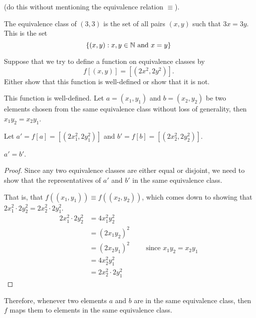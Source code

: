 \begin{problem}
\begin{enumalph}
      (do this without mentioning the equivalence relation $\equiv$).
      \begin{Answer}
        The equivalence class of $(3, 3)$ is the set of all pairs $(x, y)$
        such that $3x = 3y$.
        This is the set
        \[ \left\{(x, y) : x, y \in \mathbb{N} \text{ and } x = y\right\}\]
      \end{Answer} 
    \item Suppose that we try to define a function on equivalence classes by
      \[ f[(x, y)] = [(2x^2, 2y^2)]. \]
      Either show that this function is well-defined or show that it is not.
      \begin{Answer}
        This function is well-defined.
        Let $a = (x_1, y_1)$ and $b = (x_2, y_2)$ be two elements chosen from the same
        equivalence class without loss of generality,
        then $x_1 y_2 = x_2 y_1$.

        \step
        Let $a' = f[a] = [(2x_1^2, 2y_1^2)]$ and $b' = f[b] = [(2x_2^2, 2y_2^2)]$.

        \step
        \begin{claim}
          $a' = b'$.
          \begin{proof}
            Since any two equivalence classes are either equal or disjoint,
            we need to show that the representatives of $a'$ and $b'$ in
            the same equivalence class.

            \step
            That is, that $f( (x_1, y_1) ) \equiv f( (x_2, y_2) )$,
            which comes down to showing that $2x_1^2 \cdot 2y_2^2 = 2x_2^2 \cdot 2y_1^2$.
            \begin{align*}
              2x_1^2 \cdot 2y_2^2 &= 4x_1^2 y_2^2 \\
              &= (2x_1y_2)^2 \\
              &= (2x_2y_1)^2 \quad \quad \text{ since $x_1y_2 = x_2 y_1$}\\
              &= 4x_2^2 y_1^2 \\
              &= 2x_2^2 \cdot 2y_1^2
            \end{align*}
          \end{proof}
        \end{claim}

        \step
        Therefore, whenever two elements $a$ and $b$ are in the same equivalence class,
        then $f$ maps them to elements in the same equivalence class.
      \end{Answer}
  \end{enumalph}
\end{problem}
